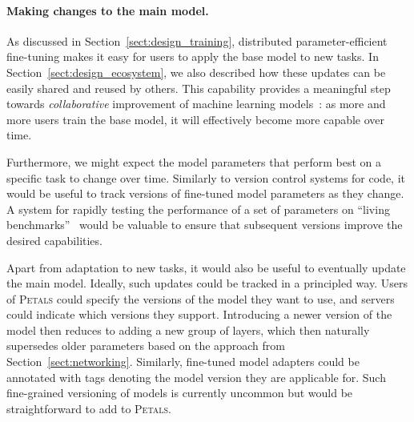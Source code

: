 \paragraph{Making changes to the main model.}
As discussed in Section~\ref{sect:design_training}, distributed parameter-efficient fine-tuning makes it easy for users to apply the base model to new tasks.
In Section~\ref{sect:design_ecosystem}, we also described how these updates can be easily shared and reused by others.
This capability provides a meaningful step towards \textit{collaborative} improvement of machine learning models~\cite{raffel2021call}:
as more and more users train the base model, it will effectively become more capable over time.


Furthermore, we might expect the model parameters that perform best on a specific task to change over time.
Similarly to version control systems for code, it would be useful to track versions of fine-tuned model parameters as they change.
A system for rapidly testing the performance of a set of parameters on ``living benchmarks''~\cite{dynabench,gehrmann2022gemv2,eval-harness} would be valuable to ensure that subsequent versions improve the desired capabilities.

Apart from adaptation to new tasks, it would also be useful to eventually update the main model.
Ideally, such updates could be tracked in a principled way.
Users of \textsc{Petals} could specify the versions of the model they want to use, and servers could indicate which versions they support.
Introducing a newer version of the model then reduces to adding a new group of layers, which then naturally supersedes older parameters based on the approach from Section~\ref{sect:networking}.
Similarly, fine-tuned model adapters could be annotated with tags denoting the model version they are applicable for.
Such fine-grained versioning of models is currently uncommon but would be straightforward to add to \textsc{Petals}.

